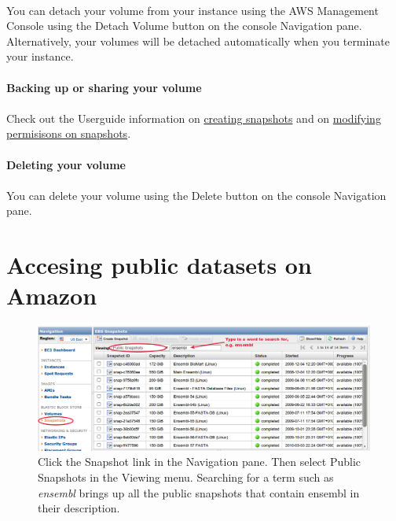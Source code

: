 \paragraph{}You can detach your volume from your instance using the AWS Management Console using the Detach Volume button on the console Navigation pane. Alternatively, your volumes will be detached automatically when you terminate your instance.

\paragraph{Backing up or sharing your volume}
\paragraph{}Check out the Userguide information on \href{http://docs.amazonwebservices.com/AWSEC2/latest/UserGuide/creating-snapshot-ebs.html}{creating snapshots} and on \href{http://docs.amazonwebservices.com/AWSEC2/latest/UserGuide/modifying-snapshot-permissions-ebs.html}{modifying permisisons on snapshots}.


\paragraph{Deleting your volume}
\paragraph{}You can delete your volume using the Delete button on the console Navigation pane. 

\section{Accesing public datasets on Amazon}
\label{section:publiccopy}
\begin{figure}[!hd]
	\fbox
	{
		\begin{minipage}{13cm}
\includegraphics[width=\maxwidth]{"images/public-ensembl"}
\caption[List public data]{\label{fig:ensembl}Click the Snapshot link in the Navigation pane. Then select Public Snapshots in the Viewing menu. Searching for a term such as \emph{ensembl} brings up all the public snapshots that contain ensembl in their description. }
		\end{minipage}
	}
\end{figure}

